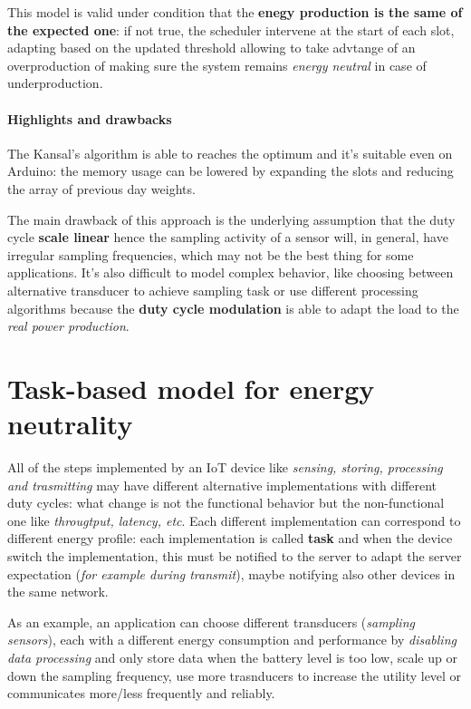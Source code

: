 \documentclass[10pt,a4paper]{report}
\theoremstyle{definition}
\begin{document}
This model is valid under condition that the \textbf{enegy production is the same of the expected one}: if not true, the scheduler intervene at the start of each slot, adapting based on the updated threshold allowing to take advtange of an overproduction of making sure the system remains \textit{energy neutral} in case of underproduction.
\paragraph{Highlights and drawbacks}\label{sec:highlights-and-drawbacks}
The Kansal's algorithm is able to reaches the optimum and it's  suitable even on Arduino: the memory usage can be lowered by expanding the slots and reducing the array of previous day weights.

The main drawback of this approach is the underlying assumption that the duty cycle \textbf{scale linear} hence the sampling activity of a sensor will, in general, have irregular sampling frequencies, which may not be the best thing for some applications.
It's also difficult to model complex behavior, like choosing between alternative transducer to achieve sampling task or use different processing algorithms because the \textbf{duty cycle modulation} is able to adapt the load to the \textit{real power production}.


\section{Task-based model for energy neutrality}\label{sec:task-based-model-for-energy-neutrality}
All of the steps implemented by an IoT device like \textit{sensing, storing, processing and trasmitting} may have different alternative implementations with different duty cycles: what change is not the functional behavior but the non-functional one like \textit{througtput, latency, etc}.
Each different implementation can correspond to different energy profile: each implementation is called \textbf{task} and when the device switch the implementation, this must be notified to the server to adapt the server expectation (\textit{for example during transmit}), maybe notifying also other devices in the same network.

As an example, an application can choose different transducers (\textit{sampling sensors}), each with a different energy consumption and performance by \textit{disabling data processing} and only store data when the battery level is too low, scale up or down the sampling frequency, use more trasnducers to increase the utility level or communicates more/less frequently and reliably.
\end{document}
